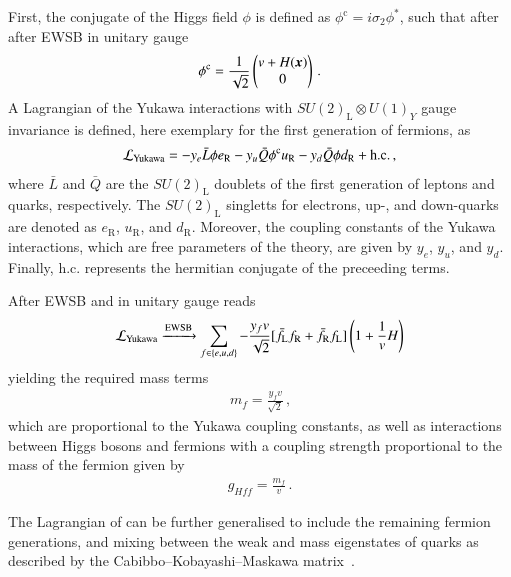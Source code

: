 First, the conjugate of the Higgs field $\phi$ is defined as
$\phi^{\text{c}} = i \sigma_2 \phi^*$, such that after after EWSB in unitary
gauge
\begin{align*}
  \phi^{\text{c}} = \frac{1}{\sqrt{2}}
  \begin{pmatrix}
    v + H(\myvec{x}) \\
    0
  \end{pmatrix} \,\text{.}
\end{align*}
A Lagrangian of the Yukawa interactions with $SU(2)_{\text{L}} \otimes U(1)_Y$
gauge invariance is defined, here exemplary for the first generation of
fermions, as
\begin{align}
  \mathcal{L}_{\text{Yukawa}} =
  - y_e \bar{L} \phi e_{\text{R}}
  - y_u \bar{Q} \phi^{\text{c}} u_{\text{R}}
  - y_d \bar{Q} \phi d_{\text{R}}
  + \text{h.c.} \,\text{,}
  \label{eq:lagrangian_yukawa}
\end{align}
where $\bar{L}$ and $\bar{Q}$ are the $SU(2)_{\text{L}}$ doublets of the first
generation of leptons and quarks, respectively. The $SU(2)_{\text{L}}$ singletts
for electrons, up-, and down-quarks are denoted as $e_{\text{R}}$,
$u_{\text{R}}$, and $d_{\text{R}}$. Moreover, the coupling constants of the
Yukawa interactions, which are free parameters of the theory, are given by
$y_e$, $y_u$, and $y_d$. Finally, $\text{h.c.}$ represents the hermitian
conjugate of the preceeding terms.

After EWSB and in unitary gauge  reads
\begin{align*}
  \mathcal{L}_{\text{Yukawa}} \xrightarrow{\text{EWSB}} \sum_{f \in \{e, u, d\}} -\frac{y_f v}{\sqrt{2}} [ \bar{f}_{\text{L}} f_{\text{R}} + \bar{f}_{\text{R}} f_{\text{L}} ] \left( 1 + \frac{1}{v} H \right)
\end{align*}
yielding the required mass terms
\begin{align*}
  m_f = \frac{y_f v}{\sqrt{2}} \,\text{,}
\end{align*}
which are proportional to the Yukawa coupling constants, as well as interactions
between Higgs bosons and fermions with a coupling strength proportional to the
mass of the fermion given by
\begin{align*}
  g_{Hff} = \frac{m_f}{v} \,\text{.}
\end{align*}

The Lagrangian of  can be further generalised to
include the remaining fermion generations, and mixing between the weak and mass
eigenstates of quarks as described by the Cabibbo--Kobayashi--Maskawa
matrix~\cite{Cabibbo:1963yz,Kobayashi:1973fv}.


